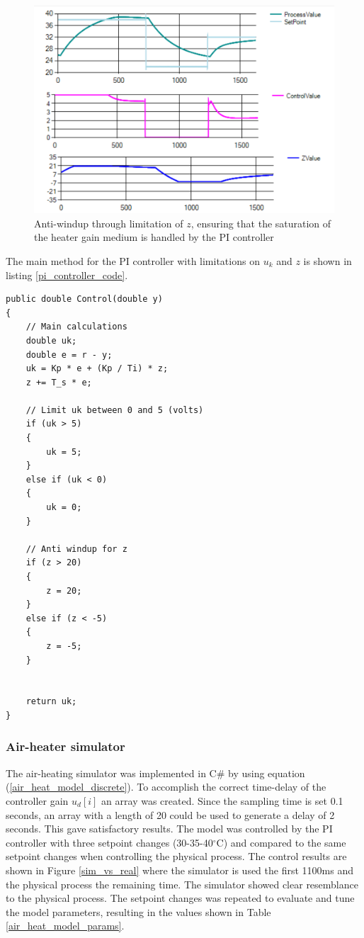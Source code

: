 \documentclass[conference]{IEEEtran}
\begin{document}
\begin{figure}[H]
    \centering
    \includegraphics[scale=0.3]{media/anti_windup4.png}
    \caption{Anti-windup through limitation of $z$, ensuring that the saturation of the heater gain medium is handled by the PI controller}
    \label{anti_windup4}
\end{figure}

The main method for the PI controller with limitations on $u_k$ and $z$ is shown in listing \ref{pi_controller_code}.

\begin{lstlisting}[caption={Implementation of the PI controller in C\#}, label={pi_controller_code}]
public double Control(double y)
{
    // Main calculations
    double uk;
    double e = r - y;
    uk = Kp * e + (Kp / Ti) * z;
    z += T_s * e;

    // Limit uk between 0 and 5 (volts)
    if (uk > 5)
    {
        uk = 5;
    }
    else if (uk < 0)
    {
        uk = 0;
    }

    // Anti windup for z
    if (z > 20)
    {
        z = 20;
    }
    else if (z < -5)
    {
        z = -5;
    }


    return uk;
}
\end{lstlisting}

\subsubsection{Air-heater simulator}
The air-heating simulator was implemented in C\# by using equation (\ref{air_heat_model_discrete}). To accomplish the correct time-delay of the controller gain $u_d[i]$ an array was created. Since the sampling time is set 0.1 seconds, an array with a length of 20 could be used to generate a delay of 2 seconds. This gave satisfactory results. The model was controlled by the PI controller with three setpoint changes (30-35-40$^{\circ}$C) and compared to the same setpoint changes when controlling the physical process. The control results are shown in Figure \ref{sim_vs_real} where the simulator is used the first 1100ms and the physical process the remaining time. The simulator showed clear resemblance to the physical process. The setpoint changes was repeated to evaluate and tune the model parameters, resulting in the values shown in Table \ref{air_heat_model_params}. 
\end{document}

